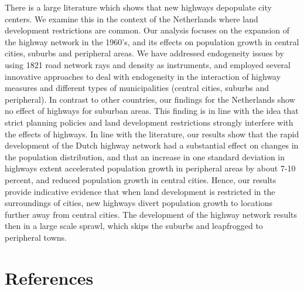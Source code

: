 \documentclass[a4paper,authoryear,review]{elsarticle}  	%
\begin{document}
	There is a large literature which shows that new highways depopulate city centers. We examine this in the context of the Netherlands where land development restrictions are common. Our analysis focuses on the expansion of the highway network in the 1960’s, and its effects on population growth in central cities, suburbs and peripheral areas. We have addressed endogeneity issues by using 1821 road network rays and density as instruments, and employed several innovative approaches to deal with endogeneity in the interaction of highway measures and different types of municipalities (central cities, suburbs and peripheral). In contrast to other countries, our findings for the Netherlands show no effect of highways for suburban areas. This finding is in line with the idea that strict planning policies and land development restrictions strongly interfere with the effects of highways. In line with the literature, our results show that the rapid development of the Dutch highway network had a substantial effect on changes in the population distribution, and that an increase in one standard deviation in highways extent accelerated population growth in peripheral areas by about 7-10 percent, and reduced population growth in central cities. Hence, our results provide indicative evidence that when land development is restricted in the surroundings of cities, new highways divert population growth to locations further away from central cities. The development of the highway network results then in a large scale sprawl, which skips the suburbs and leapfrogged to peripheral towns. 
	


\section*{References}
	\setlength{\bibsep}{0pt}
	
	

\newpage
\appendix
\renewcommand*{\thesection}{\appendixname~\Alph{section}}
\renewcommand\thetable{\Alph{section}.\arabic{table}} 
\renewcommand\thefigure{\Alph{section}.\arabic{figure}} 
\setcounter{table}{0}   
\setcounter{figure}{0}   
\end{document}
